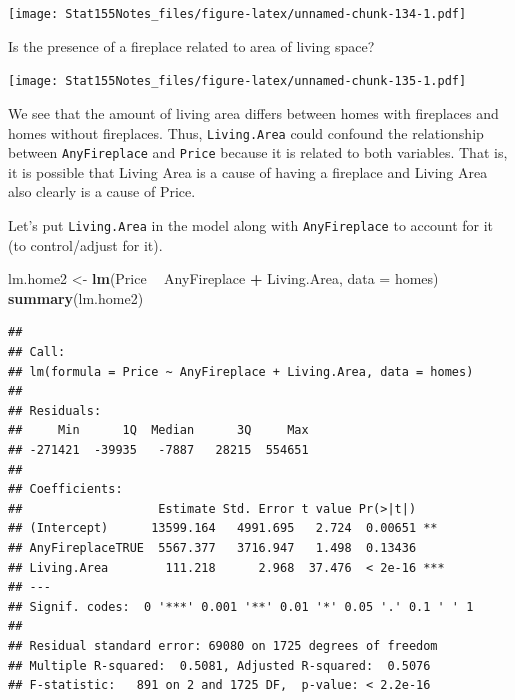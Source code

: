 \documentclass[]{book}
\newenvironment{Shaded}{\begin{snugshade}}{\end{snugshade}}
\newcommand{\DataTypeTok}[1]{\textcolor[rgb]{0.13,0.29,0.53}{#1}}
\newcommand{\KeywordTok}[1]{\textcolor[rgb]{0.13,0.29,0.53}{\textbf{#1}}}
\newcommand{\NormalTok}[1]{#1}
\newcommand{\OperatorTok}[1]{\textcolor[rgb]{0.81,0.36,0.00}{\textbf{#1}}}
\newcommand{\StringTok}[1]{\textcolor[rgb]{0.31,0.60,0.02}{#1}}
\begin{document}
\texttt{[image: Stat155Notes\_files/figure-latex/unnamed-chunk-134-1.pdf]}

Is the presence of a fireplace related to area of living space?

\begin{Shaded}
\end{Shaded}

\texttt{[image: Stat155Notes\_files/figure-latex/unnamed-chunk-135-1.pdf]}

We see that the amount of living area differs between homes with fireplaces and homes without fireplaces. Thus, \texttt{Living.Area} could confound the relationship between \texttt{AnyFireplace} and \texttt{Price} because it is related to both variables. That is, it is possible that Living Area is a cause of having a fireplace and Living Area also clearly is a cause of Price.

Let's put \texttt{Living.Area} in the model along with \texttt{AnyFireplace} to account for it (to control/adjust for it).

\begin{Shaded}
\begin{Highlighting}[]
\NormalTok{lm.home2 <-}\StringTok{ }\KeywordTok{lm}\NormalTok{(Price }\OperatorTok{~}\StringTok{ }\NormalTok{AnyFireplace }\OperatorTok{+}\StringTok{ }\NormalTok{Living.Area, }\DataTypeTok{data =}\NormalTok{ homes)}
\KeywordTok{summary}\NormalTok{(lm.home2)}
\end{Highlighting}
\end{Shaded}

\begin{verbatim}
## 
## Call:
## lm(formula = Price ~ AnyFireplace + Living.Area, data = homes)
## 
## Residuals:
##     Min      1Q  Median      3Q     Max 
## -271421  -39935   -7887   28215  554651 
## 
## Coefficients:
##                   Estimate Std. Error t value Pr(>|t|)    
## (Intercept)      13599.164   4991.695   2.724  0.00651 ** 
## AnyFireplaceTRUE  5567.377   3716.947   1.498  0.13436    
## Living.Area        111.218      2.968  37.476  < 2e-16 ***
## ---
## Signif. codes:  0 '***' 0.001 '**' 0.01 '*' 0.05 '.' 0.1 ' ' 1
## 
## Residual standard error: 69080 on 1725 degrees of freedom
## Multiple R-squared:  0.5081, Adjusted R-squared:  0.5076 
## F-statistic:   891 on 2 and 1725 DF,  p-value: < 2.2e-16
\end{verbatim}
\end{document}
